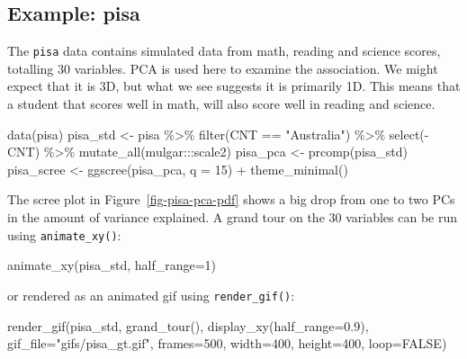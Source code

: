 \documentclass[
  letterpaper,
]{krantz}
\newenvironment{Shaded}{\begin{snugshade}}{\end{snugshade}}
\newcommand{\AttributeTok}[1]{\textcolor[rgb]{0.40,0.45,0.13}{#1}}
\newcommand{\ConstantTok}[1]{\textcolor[rgb]{0.56,0.35,0.01}{#1}}
\newcommand{\DecValTok}[1]{\textcolor[rgb]{0.68,0.00,0.00}{#1}}
\newcommand{\FloatTok}[1]{\textcolor[rgb]{0.68,0.00,0.00}{#1}}
\newcommand{\FunctionTok}[1]{\textcolor[rgb]{0.28,0.35,0.67}{#1}}
\newcommand{\NormalTok}[1]{\textcolor[rgb]{0.00,0.23,0.31}{#1}}
\newcommand{\OtherTok}[1]{\textcolor[rgb]{0.00,0.23,0.31}{#1}}
\newcommand{\SpecialCharTok}[1]{\textcolor[rgb]{0.37,0.37,0.37}{#1}}
\newcommand{\StringTok}[1]{\textcolor[rgb]{0.13,0.47,0.30}{#1}}
\begin{document}
\subsection{Example: pisa}\label{example-pisa}


The \texttt{pisa} data contains simulated data from math, reading and
science scores, totalling 30 variables. PCA is used here to examine the
association. We might expect that it is 3D, but what we see suggests it
is primarily 1D. This means that a student that scores well in math,
will also score well in reading and science.

\begin{Shaded}
\begin{Highlighting}[]
\FunctionTok{data}\NormalTok{(pisa)}
\NormalTok{pisa\_std }\OtherTok{\textless{}{-}}\NormalTok{ pisa }\SpecialCharTok{\%\textgreater{}\%}
  \FunctionTok{filter}\NormalTok{(CNT }\SpecialCharTok{==} \StringTok{"Australia"}\NormalTok{) }\SpecialCharTok{\%\textgreater{}\%}
  \FunctionTok{select}\NormalTok{(}\SpecialCharTok{{-}}\NormalTok{CNT) }\SpecialCharTok{\%\textgreater{}\%}
  \FunctionTok{mutate\_all}\NormalTok{(mulgar}\SpecialCharTok{:::}\NormalTok{scale2)}
\NormalTok{pisa\_pca }\OtherTok{\textless{}{-}} \FunctionTok{prcomp}\NormalTok{(pisa\_std)}
\NormalTok{pisa\_scree }\OtherTok{\textless{}{-}} \FunctionTok{ggscree}\NormalTok{(pisa\_pca, }\AttributeTok{q =} \DecValTok{15}\NormalTok{) }\SpecialCharTok{+} \FunctionTok{theme\_minimal}\NormalTok{()}
\end{Highlighting}
\end{Shaded}

The scree plot in Figure~\ref{fig-pisa-pca-pdf} shows a big drop from
one to two PCs in the amount of variance explained. A grand tour on the
30 variables can be run using \texttt{animate\_xy()}:

\begin{Shaded}
\begin{Highlighting}[]
\FunctionTok{animate\_xy}\NormalTok{(pisa\_std, }\AttributeTok{half\_range=}\DecValTok{1}\NormalTok{)}
\end{Highlighting}
\end{Shaded}

or rendered as an animated gif using \texttt{render\_gif()}:

\begin{Shaded}
\begin{Highlighting}[]
\FunctionTok{render\_gif}\NormalTok{(pisa\_std, }
           \FunctionTok{grand\_tour}\NormalTok{(), }
           \FunctionTok{display\_xy}\NormalTok{(}\AttributeTok{half\_range=}\FloatTok{0.9}\NormalTok{),}
           \AttributeTok{gif\_file=}\StringTok{"gifs/pisa\_gt.gif"}\NormalTok{,}
           \AttributeTok{frames=}\DecValTok{500}\NormalTok{,}
           \AttributeTok{width=}\DecValTok{400}\NormalTok{,}
           \AttributeTok{height=}\DecValTok{400}\NormalTok{,}
           \AttributeTok{loop=}\ConstantTok{FALSE}\NormalTok{)}
\end{Highlighting}
\end{Shaded}
\end{document}
